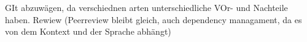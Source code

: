 \documentclass[11pt]{article}
\begin{document}


GIt abzuwägen, da verschiednen arten unterschiedliche VOr- und Nachteile haben. Rewiew (Peerreview bleibt gleich, auch dependency managament, da es von dem Kontext und der Sprache abhängt)



\end{document}
